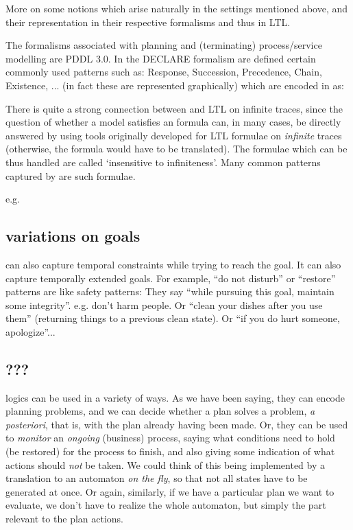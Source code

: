 \begin{center}
More on some notions which arise naturally in the settings mentioned above,
and their representation in their respective formalisms and thus in LTL.

The formalisms associated with planning and (terminating) process/service modelling are
PDDL 3.0.
In the DECLARE formalism are defined certain commonly used patterns such as:
Response, Succession, Precedence, Chain, Existence, ...
(in fact these are represented graphically)
which are encoded in \ltlf as:


There is quite a strong connection between \ltlf and LTL on infinite traces,
since the question of whether a model satisfies an \ltlf formula can,
in many cases, be directly answered by using tools originally developed for LTL formulae on
\emph{infinite} traces (otherwise, the formula would have to be translated).
The formulae which can be thus handled are called `insensitive to infiniteness'.
\cite{ldlfinsens}
Many common patterns captured by \ltlf are such formulae.

e.g.

\subsection{variations on goals}
\ltlf can also capture temporal constraints while trying to reach the goal.
It can also capture temporally extended goals.
For example, ``do not disturb'' or ``restore'' patterns are like safety patterns:
They say ``while pursuing this goal, maintain some integrity''. e.g. don't harm people.
Or ``clean your dishes after you use them'' (returning things to a previous clean state).
Or ``if you do hurt someone, apologize''...

\subsection{???}
logics can be used in a variety of ways. As we have been saying,
they can encode planning problems, and
we can decide whether a plan solves a problem, \emph{a posteriori}, that is,
with the plan already having been made.
Or, they can be used to \emph{monitor} an \emph{ongoing} (business) process, saying
what conditions need to hold (be restored) for the process to finish, and also
giving some indication of what actions should \emph{not} be taken.
We could think of this being implemented by a translation to an automaton \emph{on the fly},
so that not all states have to be generated at once.
Or again, similarly, if we have a particular plan we want to evaluate, we don't have to
realize the whole automaton, but simply the part relevant to the plan actions.


\end{center}
